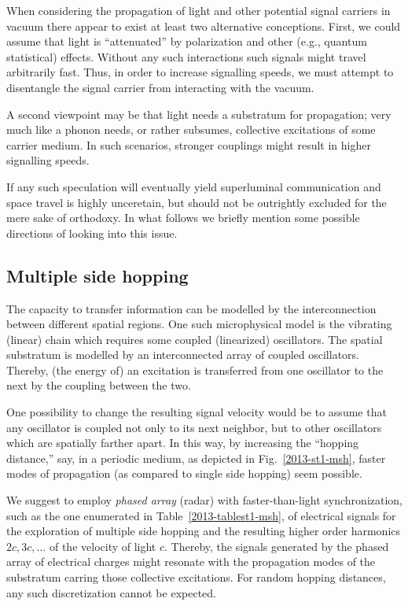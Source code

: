 \documentclass[%
  twocolumn,
 showpacs,
 showkeys,
 preprintnumbers,
 amsmath,amssymb,
 aps,
 prl,
  longbibliography,
 ]{revtex4-1}
\theoremstyle{definition}
\theoremstyle{remark}
\begin{document}
When considering the propagation of light and other potential signal carriers in vacuum
there appear to exist at least two alternative conceptions.
First, we could assume that light is ``attenuated'' by polarization
and other (e.g., quantum statistical) effects.
Without any such interactions such signals might travel arbitrarily fast.
Thus, in order to increase signalling speeds,
we must attempt to disentangle the signal carrier from interacting with the vacuum.

A second viewpoint may be that light needs a substratum for propagation;
very much like a phonon needs, or rather subsumes,
collective excitations of some carrier medium.
In such scenarios, stronger couplings might result in higher signalling speeds.

If any such speculation will eventually yield superluminal communication and space travel is highly unceretain,
but should not be outrightly excluded for the mere sake of orthodoxy.
In what follows we briefly mention some possible directions of looking into this issue.



\subsection{Multiple side hopping}

The capacity to transfer information can be modelled by the interconnection between different spatial regions.
One such microphysical model is the vibrating (linear) chain \cite[Sec.~1.2]{Henley-Thirring-EQFT}
which requires some coupled (linearized) oscillators.
The spatial substratum  \cite{einstein-aether,dirac-aether} is modelled by an interconnected array of coupled oscillators.
Thereby, (the energy of) an excitation is transferred from one oscillator to the next by the coupling between the two.

One possibility to change the resulting signal velocity would be to assume that any oscillator is coupled not only to its next neighbor,
but to other oscillators which are spatially farther apart. In this way, by increasing the ``hopping distance,''
say, in a periodic medium, as depicted in Fig.~\ref{2013-st1-msh},
faster modes of propagation (as compared to single side hopping) seem possible.

We suggest to employ {\em  phased array} (radar) with faster-than-light synchronization, such as the
one enumerated in Table~\ref{2013-tablest1-msh}, of electrical signals
for the exploration of multiple side hopping and the resulting higher order harmonics $2c, 3c,\ldots $ of the velocity of light $c$.
Thereby, the signals generated by the phased array of electrical charges
might resonate with the propagation modes of the substratum carring those collective excitations.
For random hopping distances, any such discretization cannot be expected.
\end{document}
